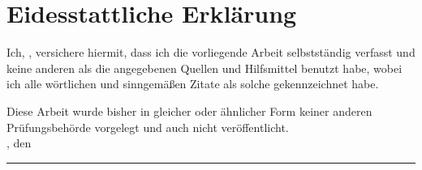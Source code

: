 \chapter*{Eidesstattliche Erklärung}
%
Ich, \autor, versichere hiermit, dass ich die vorliegende Arbeit
selbstständig verfasst und keine anderen als die angegebenen Quellen und Hilfsmittel benutzt habe, wobei ich alle wörtlichen und sinngemäßen Zitate als solche gekennzeichnet habe.\par
%
Diese Arbeit wurde bisher in gleicher oder ähnlicher Form keiner anderen Prüfungsbehörde vorgelegt und auch nicht veröffentlicht.\\[5ex]
%
\ort, den \datum\\[5ex]
%
\rule[-0.2cm]{5cm}{0.5pt}\\
%
\textsc{\autor} 